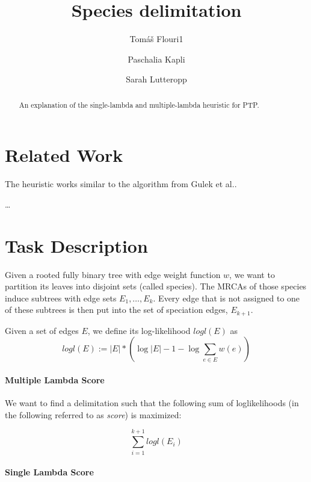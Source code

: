 \documentclass{llncs}
\begin{document}
\title{Species delimitation}


\author{Tom\'{a}\v{s} Flouri1 \and Paschalia Kapli \and Sarah Lutteropp}

\maketitle

\begin{abstract}
An explanation of the single-lambda and multiple-lambda heuristic for PTP.
\end{abstract}

\section{Related Work}

The heuristic works similar to the algorithm from Gulek et al.\cite{Gulek:2010:DPA:1838770.1839019}.

\ldots

\section{Task Description}

Given a rooted fully binary tree with edge weight function $w$, we want to partition its leaves into disjoint sets (called species). The MRCAs of those species induce subtrees with edge sets $E_1, \ldots, E_{k}$. Every edge that is not assigned to one of these subtrees is then put into the set of speciation edges, $E_{k+1}$.

Given a set of edges $E$, we define its log-likelihood $logl(E)$ as
$$logl(E) := |E| * (\log{|E|} - 1 - \log{\sum_{e \in E} w(e)})$$

\paragraph{Multiple Lambda Score}

We want to find a delimitation such that the following sum of loglikelihoods (in the following referred to as \emph{score}) is maximized:

$$\sum_{i=1}^{k+1}{logl(E_i)}$$

\paragraph{Single Lambda Score}
\end{document}
